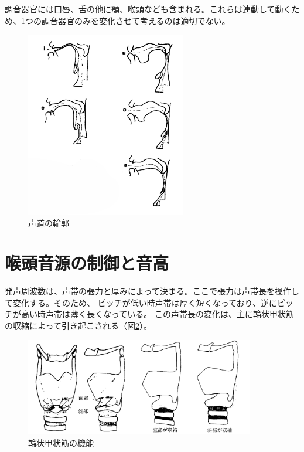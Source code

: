 \documentclass[12ptj,a4j,dvipdfmx,uplatex, titlepage]{jsarticle}
\begin{document}
調音器官には口唇、舌の他に顎、喉頭なども含まれる。これらは連動して動くため、1つの調音器官のみを変化させて考えるのは適切でない。
\begin{figure}[htbp]
    \begin{center}
      \includegraphics[clip,width=7.0cm]{声道形状.png}
      \caption{声道の輪郭\cite{science}}
      \label{fig:seido}
    \end{center}
\end{figure}

\section{喉頭音源の制御と音高}
発声周波数は、声帯の張力と厚みによって決まる。ここで張力は声帯長を操作して変化する。そのため、
ピッチが低い時声帯は厚く短くなっており、逆にピッチが高い時声帯は薄く長くなっている。
この声帯長の変化は、主に輪状甲状筋の収縮によって引き起こされる（図\ref{fig:rinjo}）。

\begin{figure}[htbp]
    \begin{center}
      \includegraphics[clip,width=10.0cm]{輪状甲状筋.png}
      \caption{輪状甲状筋の機能\cite{science}}
      \label{fig:rinjo}
    \end{center}
\end{figure}
\end{document}
